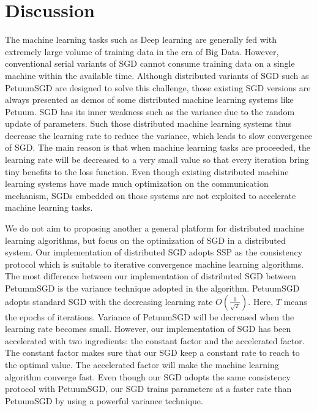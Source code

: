 \documentclass[10pt,journal,finalsubmission,compsoc]{IEEEtran}
\begin{document}
\section{Discussion}
\label{discussion}
The machine learning tasks such as Deep learning are generally fed with extremely large volume of training data in the era of Big Data. However, conventional serial variants of SGD  cannot consume training data on a single machine within the available time. Although distributed variants of SGD such as PetuumSGD are designed to solve this challenge, those existing SGD versions are always presented as demos of some distributed machine learning systems like Petuum. SGD has its inner weakness such as the variance due to the random update of parameters. Such those distributed machine learning systems thus decrease the learning rate to reduce the variance, which leads to slow convergence of SGD. The main reason is that when machine learning tasks are proceeded, the learning rate will be decreased to a very small value so that every iteration bring tiny benefits to the loss function. Even though existing distributed machine learning systems have made much optimization on the communication mechanism, SGDs embedded on those systems are not exploited to accelerate machine learning tasks. 

We do not aim to proposing another a general platform for distributed machine learning algorithms, but focus on the optimization of SGD in a distributed system. Our implementation of distributed SGD adopts SSP as the consistency protocol which is suitable to iterative convergence machine learning algorithms. The most difference between our implementation of distributed SGD between PetummSGD is the variance technique adopted in the algorithm. PetuumSGD adopts standard SGD with the decreasing learning rate $O(\frac{1}{\sqrt{T}})$. Here, $T$ means the epochs of iterations. Variance of PetuumSGD will be decreased when the learning rate becomes small. However, our implementation of SGD has been accelerated with two ingredients: the constant factor and the accelerated factor. The constant factor makes sure that our SGD keep a constant rate to reach to the optimal value. The accelerated factor will make the machine learning algorithm converge fast. Even though our SGD adopts the same consistency protocol with PetuumSGD, our SGD trains parameters at a faster rate than PetuumSGD by using a powerful variance technique. 
\end{document}
